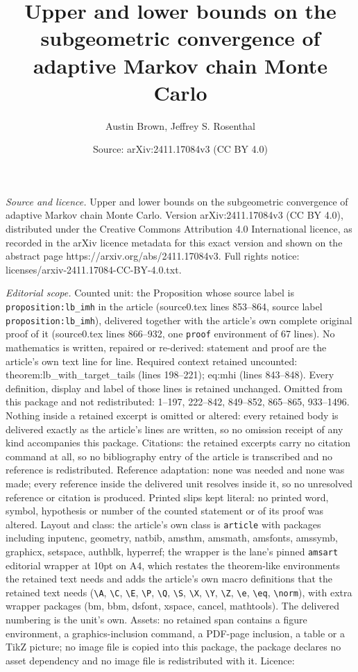 \documentclass[10pt,a4paper]{amsart}
\title[Upper and lower bounds on the subgeometric convergence of ad]{Upper and lower bounds on the subgeometric convergence of adaptive Markov chain Monte Carlo}
\author{Austin Brown, Jeffrey S. Rosenthal}
\date{Source: arXiv:2411.17084v3 (CC BY 4.0)}
\begin{document}
\maketitle

\noindent\emph{Source and licence.} Upper and lower bounds on the subgeometric convergence of adaptive Markov chain Monte Carlo. Version arXiv:2411.17084v3 (CC BY 4.0), distributed under the Creative Commons Attribution 4.0 International licence, as recorded in the arXiv licence metadata for this exact version and shown on the abstract page https://arxiv.org/abs/2411.17084v3. Full rights notice: licenses/arxiv-2411.17084-CC-BY-4.0.txt.\par\smallskip

\noindent\textit{Editorial scope.} Counted unit: the Proposition whose source label is \texttt{proposition:lb\_imh} in the article (source0.tex lines 853--864, source label \texttt{proposition:lb\_imh}), delivered together with the article's own complete original proof of it (source0.tex lines 866--932, one \texttt{proof} environment of 67 lines). No mathematics is written, repaired or re-derived: statement and proof are the article's own text line for line. Required context retained uncounted: theorem:lb\_with\_target\_tails (lines 198--221); eq:mhi (lines 843--848). Every definition, display and label of those lines is retained unchanged. Omitted from this package and not redistributed: 1--197, 222--842, 849--852, 865--865, 933--1496. Nothing inside a retained excerpt is omitted or altered: every retained body is delivered exactly as the article's lines are written, so no omission receipt of any kind accompanies this package. Citations: the retained excerpts carry no citation command at all, so no bibliography entry of the article is transcribed and no reference is redistributed. Reference adaptation: none was needed and none was made; every reference inside the delivered unit resolves inside it, so no unresolved reference or citation is produced. Printed slips kept literal: no printed word, symbol, hypothesis or number of the counted statement or of its proof was altered. Layout and class: the article's own class is \texttt{article} with packages including inputenc, geometry, natbib, amsthm, amsmath, amsfonts, amssymb, graphicx, setspace, authblk, hyperref; the wrapper is the lane's pinned \texttt{amsart} editorial wrapper at 10pt on A4, which restates the theorem-like environments the retained text needs and adds the article's own macro definitions that the retained text needs (\texttt{\textbackslash A}, \texttt{\textbackslash C}, \texttt{\textbackslash E}, \texttt{\textbackslash P}, \texttt{\textbackslash Q}, \texttt{\textbackslash S}, \texttt{\textbackslash X}, \texttt{\textbackslash Y}, \texttt{\textbackslash Z}, \texttt{\textbackslash e}, \texttt{\textbackslash eq}, \texttt{\textbackslash norm}), with extra wrapper packages (bm, bbm, dsfont, xspace, cancel, mathtools). The delivered numbering is the unit's own. Assets: no retained span contains a figure environment, a graphics-inclusion command, a PDF-page inclusion, a table or a TikZ picture; no image file is copied into this package, the package declares no asset dependency and no image file is redistributed with it. Licence: 
\end{document}
